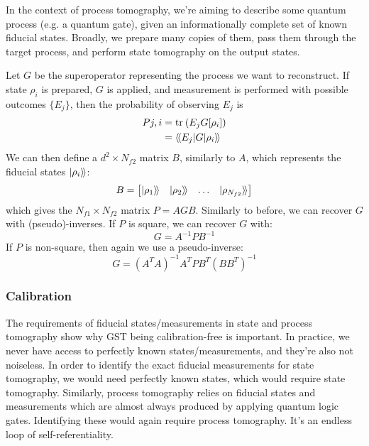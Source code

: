 In the context of process tomography, we're aiming to describe some quantum process (e.g. a quantum
gate), given an informationally complete set of known fiducial states. Broadly,
we prepare many copies of them, pass them through the target process, and perform state tomography
on the output states.

Let $G$ be the superoperator representing the process we want to reconstruct. If state $\rho_i$ is
prepared, $G$ is applied, and measurement is performed with possible outcomes $\{E_j\}$, then the
probability of observing $E_j$ is
\begin{equation}
    \begin{aligned}
        P{j,i} &= \text{tr}_{}\left(E_j G[\rho_i]\right) \\
               &= \langle\!\braket{E_j | G | \rho_i}\!\rangle
    \end{aligned}
\end{equation}
We can then define a $d^2 \times N_{f2}$ matrix $B$, similarly to $A$, which represents the fiducial
states $\ket{\rho_i}\!\rangle$:
\begin{equation}
    B = 
    \begin{bmatrix}
        \ket{\rho_1}\!\rangle & \ket{\rho_2}\!\rangle & \dots & \ket{\rho_{N_{f2}}}\!\rangle
    \end{bmatrix}
\end{equation}
which gives the $N_{f1} \times N_{f2}$ matrix $P = AGB$. Similarly to before, we can recover $G$
with (pseudo)-inverses. If $P$ is square, we can recover $G$ with:
\begin{equation}
    G = A^{-1} P B^{-1}
\end{equation}
If $P$ is non-square, then again we use a pseudo-inverse:
\begin{equation}
    G = (A^T A)^{-1} A^T P B^T (B B^T)^{-1}
\end{equation}

\subsubsection{Calibration}

The requirements of fiducial states/measurements in state and process tomography show why GST being
calibration-free is important. In practice, we never have access to perfectly known
states/measurements, and they're also not noiseless. In order to identify the exact fiducial
measurements for state tomography, we would need perfectly known states, which would require state
tomography.  Similarly, process tomography relies on fiducial states and measurements which are
almost always produced by applying quantum logic gates. Identifying these would again require
process tomography. It's an endless loop of self-referentiality.

